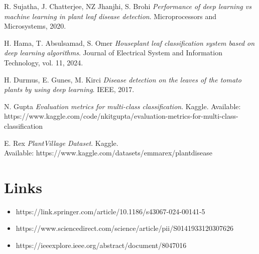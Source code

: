 \documentclass[12pt]{article}
\begin{document}
\begin{thebibliography}{9}

R. Sujatha, J. Chatterjee, NZ Jhanjhi, S. Brohi 
\textit{Performance of deep learning vs machine learning in plant leaf
disease detection}. 
Microprocessors and Microsystems, 2020.

H. Hama, T. Absulsamad, S. Omer
\textit{Houseplant leaf classification system based on deep learning algorithms}. 
Journal of Electrical System and Information Technology, vol. 11, 2024.

H. Durmus, E. Gunes, M. Kirci
\textit{Disease detection on the leaves of the tomato plants by using deep learning}. 
IEEE, 2017.

N. Gupta
\textit{Evaluation metrics for multi-class classification}.
Kaggle. \newline
Available: https://www.kaggle.com/code/nkitgupta/evaluation-metrics-for-multi-class-classification

E. Rex
\textit{PlantVillage Dataset}.
Kaggle.\\
Available: {https://www.kaggle.com/datasets/emmarex/plantdisease}

\end{thebibliography}



\section*{Links}

\begin{itemize}
    \item 
    https://link.springer.com/article/10.1186/s43067-024-00141-5

    \item https://www.sciencedirect.com/science/article/pii/S0141933120307626

    \item https://ieeexplore.ieee.org/abstract/document/8047016
\end{itemize}
\end{document}
